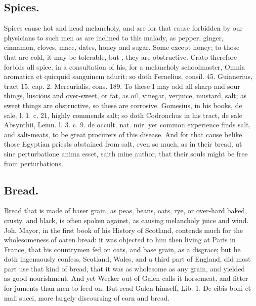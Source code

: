 {{\subsection{Spices.}
Spices cause hot and head melancholy, and are for that cause
forbidden by our physicians to such men as are inclined to this malady,
as pepper, ginger, cinnamon, cloves, mace, dates, \etc{} honey and sugar.
Some except honey; to those that are cold, it may be tolerable,
but , they
are obstructive. Crato therefore forbids all spice, in a consultation
of his, for a melancholy schoolmaster, Omnia aromatica et quicquid
sanguinem adurit: so doth Fernelius, consil. 45. Guianerius, tract 15.
cap. 2. Mercurialis, cons. 189. To these I may add all sharp and sour
things, luscious and over-sweet, or fat, as oil, vinegar, verjuice,
mustard, salt; as sweet things are obstructive, so these are corrosive.
Gomesius, in his books, de sale, l. 1. c. 21, highly commends salt; so
doth Codronchus in his tract, de sale Absynthii, Lemn. l. 3. c. 9. de
occult. nat. mir. yet common experience finds salt, and salt-meats, to
be great procurers of this disease. And for that cause belike those
Egyptian priests abstained from salt, even so much, as in their bread,
ut sine perturbatione anima esset, saith mine author, that their souls
might be free from perturbations.

\subsection{Bread.}
Bread that is made of baser grain, as peas, beans, oats, rye,
or over-hard baked, crusty, and black, is often spoken against,
as causing melancholy juice and wind. Joh. Mayor, in the first book of
his History of Scotland, contends much for the wholesomeness of oaten
bread: it was objected to him then living at Paris in France, that his
countrymen fed on oats, and base grain, as a disgrace; but he doth
ingenuously confess, Scotland, Wales, and a third part of England, did
most part use that kind of bread, that it was as wholesome as any
grain, and yielded as good nourishment. And yet Wecker out of Galen
calls it horsemeat, and fitter for juments than men to feed on. But
read Galen himself, Lib. 1. De cibis boni et mali succi, more largely
discoursing of corn and bread.

}}
